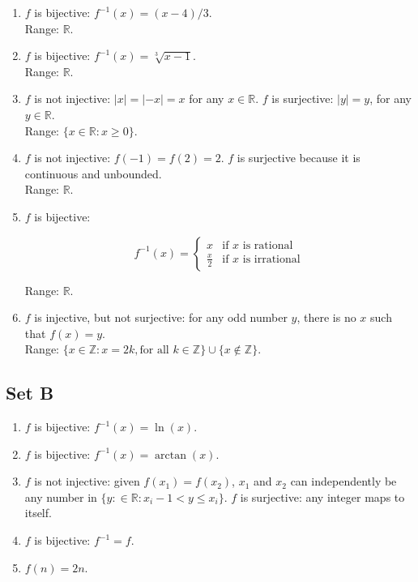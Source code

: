 \documentclass{article}
\begin{document}
\begin{enumerate}
    \item $f$ is bijective: $f^{-1}(x) = (x - 4)/3$.\\ Range: $\mathbb{R}$.

    \item $f$ is bijective: $f^{-1}(x) = \sqrt[3]{x - 1}$.\\ Range: $\mathbb{R}$.

    \item $f$ is not injective: $|x| = |-x| = x$ for any $x \in \mathbb{R}$. $f$ is surjective: $|y| = y$, for any $y \in \mathbb{R}$.\\ Range: $\{x \in \mathbb{R}: x \geqslant 0\}$.

    \item $f$ is not injective: $f(-1) = f(2) = 2$. $f$ is surjective because it is continuous and unbounded.\\ Range: $\mathbb{R}$.

    \item $f$ is bijective: 
        
       \[
        f^{-1}(x) = 
            \begin{cases}
                x & \text{if $x$ is rational} \\
                \frac{x}{2} & \text{if $x$ is irrational}
            \end{cases}
        \]

      Range: $\mathbb{R}$.

    \item $f$ is injective, but not surjective: for any odd number $y$, there is no $x$ such that $f(x) = y$.\\ Range: $\{x \in \mathbb{Z}: x = 2k, \text{for all $k \in \mathbb{Z}$}\} \cup \{x \notin \mathbb{Z}\}$.
\end{enumerate}


\subsection{Set B}
\begin{enumerate}
    \item $f$ is bijective: $f^{-1}(x) = \ln(x)$.

    \item $f$ is bijective: $f^{-1}(x) = \arctan(x)$.

    \item $f$ is not injective: given $f(x_1) = f(x_2)$, $x_1$ and $x_2$ can independently be any number in $\{y: \in \mathbb{R}: x_i - 1 < y \leqslant x_i\}$. $f$ is surjective: any integer maps to itself.

    \item $f$ is bijective: $f^{-1} = f$.

    \item $f(n) = 2n$.
\end{enumerate}
\end{document}
